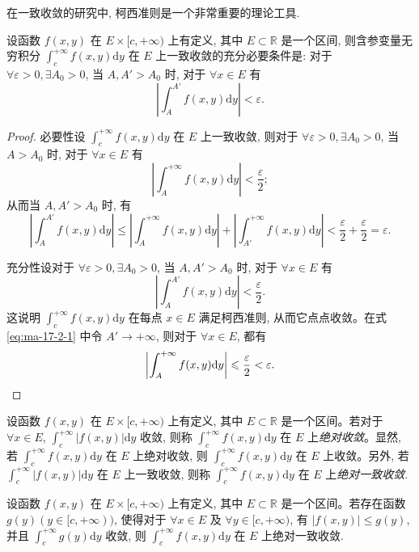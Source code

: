 在一致收敛的研究中, 柯西准则是一个非常重要的理论工具.

\begin{theorem}\label{theorem:ma-17-2-1}
设函数 $f(x,y)$ 在 $E\times[c,+\infty)$ 上有定义, 其中 $E\subset\mathbb R$ 是一个区间, 则含参变量无穷积分 $\int_c^{+\infty}f(x,y)\mathrm dy$ 在 $E$ 上一致收敛的充分必要条件是: 对于 $\forall\varepsilon>0,\exists A_0>0$, 当 $A,A'>A_0$ 时, 对于 $\forall x\in E$ 有
\[
  \left|\int_A^{A'}f(x,y)\mathrm dy\right|<\varepsilon.
\]
\end{theorem}


\begin{proof}
必要性\quad 设 $\int_c^{+\infty}f(x,y)\mathrm dy$ 在 $E$ 上一致收敛, 则对于 $\forall\varepsilon>0,\exists A_0>0$, 当 $A>A_0$ 时, 对于 $\forall x\in E$ 有
\[
  \left|\int_A^{+\infty}f(x,y)\mathrm dy\right|<\frac{\varepsilon}{2};
\]
从而当 $A,A'>A_0$ 时, 有
\[
  \left|\int_A^{A'}f(x,y)\mathrm dy\right|
  \leqslant\left|\int_A^{+\infty}f(x,y)\mathrm dy\right|
    +\left|\int_{A'}^{+\infty}f(x,y)\mathrm dy\right|
  <\frac{\varepsilon}{2}+\frac{\varepsilon}{2}=\varepsilon.
\]

充分性\quad 设对于 $\forall\varepsilon>0,\exists A_0>0$, 当 $A,A'>A_0$ 时, 对于 $\forall x\in E$ 有
\begin{equation}
  \left|\int_A^{A'}f(x,y)\mathrm dy\right|<\frac{\varepsilon}{2}.
  \label{eq:ma-17-2-1}
\end{equation}
这说明 $\int_c^{+\infty}f(x,y)\mathrm dy$ 在每点 $x\in E$ 满足柯西准则, 从而它点点收敛。在式 \eqref{eq:ma-17-2-1} 中令 $A'\to+\infty$, 则对于 $\forall x\in E$, 都有
\[
  \left|\int_A^{+\infty}f(x,y)\mathrm dy\right|\leqslant\frac{\varepsilon}{2}<\varepsilon.
\qedhere
\]
\end{proof}


设函数 $f(x,y)$ 在 $E\times[c,+\infty)$ 上有定义, 其中 $E\subset\mathbb R$ 是一个区间。若对于 $\forall x\in E$, $\int_c^{+\infty}|f(x,y)|\mathrm dy$ 收敛, 则称 $\int_c^{+\infty}f(x,y)\mathrm dy$ 在 $E$ 上\emph{绝对收敛}。显然, 若 $\int_c^{+\infty}f(x,y)\mathrm dy$ 在 $E$ 上绝对收敛, 则 $\int_c^{+\infty}f(x,y)\mathrm dy$ 在 $E$ 上收敛。另外, 若 $\int_c^{+\infty}|f(x,y)|\mathrm dy$ 在 $E$ 上一致收敛, 则称 $\int_c^{+\infty}f(x,y)\mathrm dy$ 在 $E$ 上\emph{绝对一致收敛}.

\begin{theorem}[{魏尔斯特拉斯定理}]\label{theorem:ma-17-2-2}
设函数 $f(x,y)$ 在 $E\times[c,+\infty)$ 上有定义, 其中 $E\subset\mathbb R$ 是一个区间。若存在函数 $g(y)(y\in[c,+\infty))$, 使得对于 $\forall x\in E$ 及 $\forall y\in[c,+\infty)$, 有 $|f(x,y)|\leqslant g(y)$, 并且 $\int_c^{+\infty}g(y)\mathrm dy$ 收敛, 则 $\int_c^{+\infty}f(x,y)\mathrm dy$ 在 $E$ 上绝对一致收敛.
\end{theorem}


